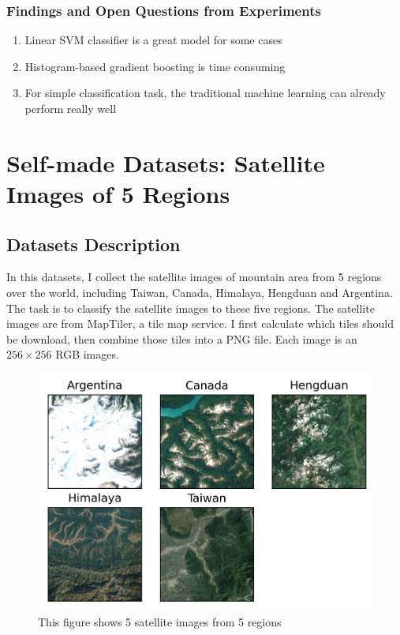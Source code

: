 \documentclass[twocolumn, draft]{extarticle}
\begin{document}
\subsubsection{Findings and Open Questions from Experiments}

\begin{enumerate}
\item Linear SVM classifier is a great model for some cases
\item Histogram-based gradient boosting is time consuming
\item For simple classification task, the traditional machine learning can already perform really well
\end{enumerate}

\section{Self-made Datasets: Satellite Images of 5 Regions}
\subsection{Datasets Description}

In this datasets, I collect the satellite images of mountain area from 5 regions over the world, including Taiwan, Canada, Himalaya, Hengduan and Argentina. The task is to classify the satellite images to these five regions. The satellite images are from MapTiler, a tile map service. I first calculate which tiles should be download, then combine those tiles into a PNG file. Each image is an $256 \times 256$ RGB images.

\begin{figure}[H]
\centering
\includegraphics[width=0.9\linewidth]{figure/terrain_regions}
\caption{This figure shows 5 satellite images from 5 regions}
\label{fig:terrainregions}
\end{figure}
\end{document}
